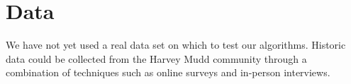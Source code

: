 \documentclass{article}
\begin{document}
\section{Data}
	We have not yet used a real data set on which to test our algorithms.
	Historic data could be collected from the Harvey Mudd community through a combination of techniques such as online surveys and in-person interviews.






\end{document}
